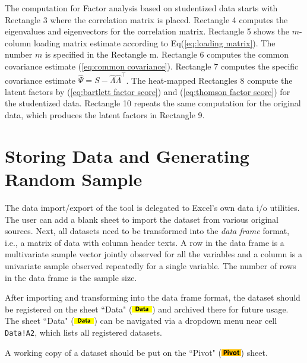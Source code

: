 \documentclass[article]{jss}
\numberwithin{equation}{subsection}
\newcommand{\shtData}{``Data" (\includegraphics[height=8pt, keepaspectratio=true]{DataSheetTab_png}) }
\newcommand{\shtPivot}{``Pivot" (\includegraphics[height=8pt, keepaspectratio=true]{PivotSheetTab_png}) }
\begin{document}
        The computation for Factor analysis based on studentized data starts with Rectangle 3 where the correlation matrix is placed. Rectangle 4 computes the eigenvalues and eigenvectors for the correlation matrix. Rectangle 5 shows the $m$-column loading matrix estimate according to Eq(\ref{eq:loading matrix}). The number $m$ is specified in the Rectangle m. Rectangle 6 computes the common covariance estimate (\ref{eq:common covariance}). Rectangle 7 computes the specific covariance estimate $\hat{\Psi} = S-\hat{\Lambda}\hat{\Lambda}^\intercal$. The heat-mapped Rectangles 8 compute the latent factors by (\ref{eq:bartlett factor score}) and (\ref{eq:thomson factor score}) for the studentized data. Rectangle 10 repeats the same computation for the original data, which produces the latent factors in Rectangle 9.
        
        \section[data]{Storing Data and Generating Random Sample}
        The data import/export of the tool is delegated to Excel's own data i/o utilities. The user can add a blank sheet to import the dataset from various original sources. Next, all datasets need to be transformed into the \textit{data frame} format, i.e., a matrix of data with column header texts. A row in the data frame is a multivariate sample vector jointly observed for all the variables and a column is a univariate sample observed repeatedly for a single variable. The number of rows in the data frame is the sample size.
        
        After importing and transforming into the data frame format, the dataset should be registered on the sheet \shtData and archived there for future usage. The sheet \shtData can be navigated via a dropdown menu near cell \texttt{Data!A2}, which lists all registered datasets. 
        
        A working copy of a dataset should be put on the \shtPivot sheet.
        
\end{document}
